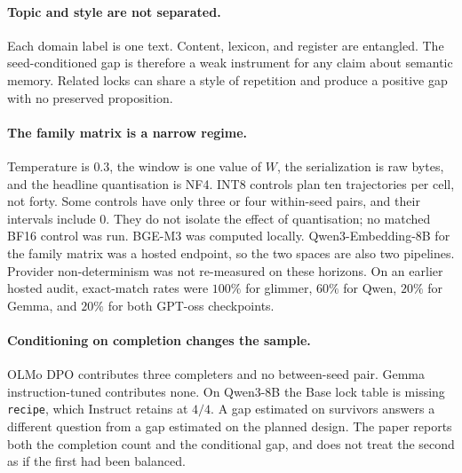 \documentclass[10pt]{article}
\begin{document}
\paragraph{Topic and style are not separated.}
Each domain label is one text.
Content, lexicon, and register are entangled. %
The seed-conditioned gap is therefore a weak instrument for any claim
about semantic memory.
Related locks can share a style of repetition and produce a positive gap
with no preserved proposition.

\paragraph{The family matrix is a narrow regime.}
Temperature is $0.3$, the window is one value of $W$, the serialization
is raw bytes, and the headline quantisation is NF4. %
INT8 controls plan ten trajectories per cell, not forty. %
Some controls have only three or four within-seed pairs, and their
intervals include $0$. %
They do not isolate the effect of quantisation; no matched BF16 control
was run.
BGE-M3 was computed locally.
Qwen3-Embedding-8B for the family matrix was a hosted endpoint, so the
two spaces are also two pipelines. %
Provider non-determinism was not re-measured on these horizons.
On an earlier hosted audit, exact-match rates were $100\%$ for
glimmer, $60\%$ for Qwen, $20\%$ for Gemma, and $20\%$ for both
GPT-oss checkpoints. %

\paragraph{Conditioning on completion changes the sample.}
OLMo DPO contributes three completers and no between-seed pair.
Gemma instruction-tuned contributes none.
On Qwen3-8B the Base lock table is missing \texttt{recipe}, which
Instruct retains at $4/4$. %
A gap estimated on survivors answers a different question from a gap
estimated on the planned design.
The paper reports both the completion count and the conditional gap,
and does not treat the second as if the first had been balanced.
\end{document}
